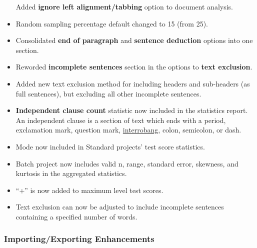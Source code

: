 \documentclass[
]{book}
\theoremstyle{definition}
\theoremstyle{definition}
\theoremstyle{definition}
\theoremstyle{definition}
\theoremstyle{remark}
\begin{document}
\begin{itemize}
  Added \textbf{ignore left alignment/tabbing} option to document analysis.
\item
  Random sampling percentage default changed to 15 (from 25).
\item
  Consolidated \textbf{end of paragraph} and \textbf{sentence deduction} options into one section.
\item
  Reworded \textbf{incomplete sentences} section in the options to \textbf{text exclusion}.
\item
  Added new text exclusion method for including headers and sub-headers (as full sentences), but excluding all other incomplete sentences.
\item
  \textbf{Independent clause count} statistic now included in the statistics report. An independent clause is a section of text which ends with a period, exclamation mark, question mark, \protect\hyperlink{glossary}{interrobang}, colon, semicolon, or dash.
\item
  Mode now included in Standard projects' test score statistics.
\item
  Batch project now includes valid n, range, standard error, skewness, and kurtosis in the aggregated statistics.
\item
  ``+'' is now added to maximum level test scores.
\item
  Text exclusion can now be adjusted to include incomplete sentences containing a specified number of words.
\end{itemize}

\hypertarget{importingexporting-enhancements-4}{%
\subsubsection*{Importing/Exporting Enhancements}\label{importingexporting-enhancements-4}}
\end{document}
